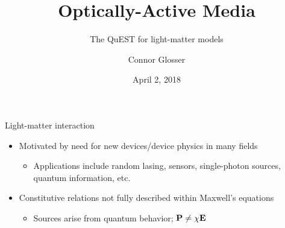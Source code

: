 \documentclass[aspectratio=169, usenames, dvipsnames]{beamer}
\title{Optically-Active Media}
\subtitle{The QuEST for light-matter models}
\date{April 2, 2018}
\author{Connor Glosser}
\institute{Michigan State University, Physics \& Electrical Engineering}
\begin{document}
\maketitle

\begin{frame}{Light-matter interaction}
  \begin{itemize}
    \item Motivated by need for new devices/device physics in many fields
      \begin{itemize}
        \item Applications include random lasing, sensors, single-photon sources, quantum information, etc.
      \end{itemize}
    \item Constitutive relations not fully described within Maxwell's equations
      \begin{itemize}
        \item Sources arise from quantum behavior; $\vb{P} \not = \chi \vb{E}$
      \end{itemize}
  \end{itemize}
  
\end{frame}
\end{document}
